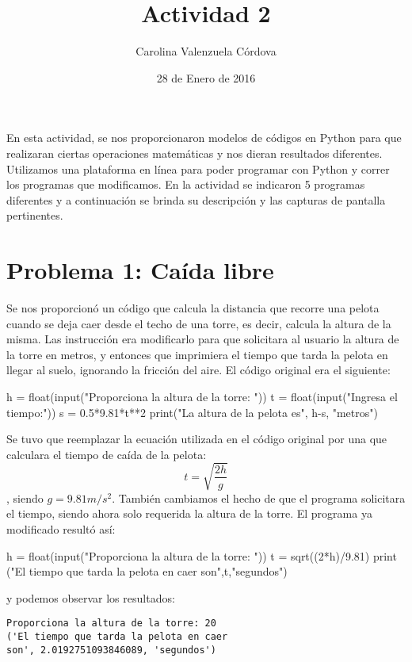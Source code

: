 \documentclass[12 pt,twocolumn]{article}
\begin{document}
\title{Actividad 2}
\author{Carolina Valenzuela Córdova}
\date{28 de Enero de 2016}
\maketitle
\newpage

En esta actividad, se nos proporcionaron modelos de códigos en Python para que realizaran ciertas operaciones matemáticas y nos dieran resultados diferentes. Utilizamos una plataforma en línea para poder programar con Python y correr los programas que modificamos. En la actividad se indicaron 5 programas diferentes y a continuación se brinda su descripción y las capturas de pantalla pertinentes.
\section{\small Problema 1: Caída libre}
Se nos proporcionó un código que calcula la distancia que recorre una pelota cuando se deja caer desde el techo de una torre, es decir, calcula la altura de la misma.
Las instrucción era modificarlo para que solicitara al usuario la altura de la torre en metros, y entonces que imprimiera el tiempo que tarda la pelota en llegar al suelo, ignorando la fricción del aire. 
El código original era el siguiente:
\begin{center}
\begin{boxedverbatim}
h = float(input("Proporciona la 
altura
de la torre: "))
t = float(input("Ingresa el
tiempo:"))
s = 0.5*9.81*t**2
print("La altura de la pelota es",
h-s,
"metros")
\end{boxedverbatim}
\end{center}
Se tuvo que reemplazar la ecuación utilizada en el código original por una que calculara el tiempo de caída de la pelota:$$t=\sqrt{\frac{2h}{g}}$$, siendo $g=9.81 m/s^2$.
También cambiamos el hecho de que el programa solicitara el tiempo, siendo ahora solo requerida la altura de la torre. El programa ya modificado resultó así:
\begin{center}
\begin{boxedverbatim}
h = float(input("Proporciona la altura
de la torre: "))
t = sqrt((2*h)/9.81)
print ("El tiempo que tarda la pelota
en caer son",t,"segundos")
\end{boxedverbatim}
\end{center}
y podemos observar los resultados:
\begin{verbatim}
Proporciona la altura de la torre: 20
('El tiempo que tarda la pelota en caer 
son', 2.0192751093846089, 'segundos')
\end{verbatim}
\end{document}

